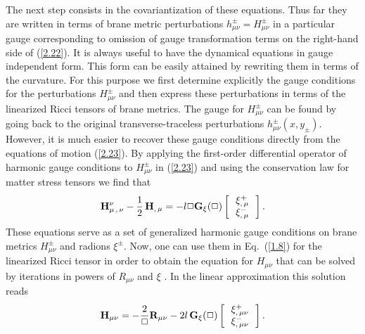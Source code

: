 \documentclass[a4paper,preprint,nofootinbib,
                 showpacs,preprintnumbers,amsmath,amssymb]{revtex4}
\begin{document}
The next step consists in the covariantization of these equations. 
Thus far they are written in terms of brane metric perturbations 
$h_{\mu\nu}^\pm=H^\pm_{\mu\nu}$ in a particular gauge 
corresponding to omission of gauge transformation terms on the 
right-hand side of (\ref{2.22}). It is always useful to have the 
dynamical equations in gauge independent form. This form can be 
easily attained by rewriting them in terms of the curvature. For 
this purpose we first determine explicitly the gauge conditions 
for the perturbations $H^\pm_{\mu\nu}$ and then express these 
perturbations in terms of the linearized Ricci tensors of brane 
metrics. The gauge for $H^\pm_{\mu\nu}$ can be found by going back 
to the original transverse-traceless perturbations 
$h_{\mu\nu}^\pm(x,y_\pm)$. However, it is much easier to recover 
these gauge conditions directly from the equations of motion 
(\ref{2.23}). By applying the first-order differential operator of 
harmonic gauge conditions to $H^\pm_{\mu\nu}$ in (\ref{2.23}) and 
using the conservation law for matter stress tensors we find that 
    \begin{equation} 
    {\bf H}^{\nu}_{\mu\,,\,\nu}- 
      \frac12\,{\bf H}_{,\,\mu} 
      =-l\Box{\bf G_\xi}(\Box) 
    \left[\begin{array}{c} 
      \,\xi^+_{,\,\mu}\,\\ 
      \,\xi^-_{,\,\mu}\,\end{array}\right].  \label{2.24a} 
    \end{equation} 
These equations serve as a set of generalized harmonic gauge 
conditions on brane metrics $H^\pm_{\mu\nu}$ and radions 
$\xi^\pm$. Now, one can use them in Eq.~(\ref{1.8}) for the 
linearized Ricci tensor in order to obtain the equation for 
$H_{\mu\nu}$ that can be solved by iterations in powers of 
$R_{\mu\nu}$ and $\xi$ \cite{CPT}. In the linear approximation 
this solution reads 
    \begin{equation} 
    {\bf H}_{\mu\nu}=-\frac2\Box {\bf R}_{\mu\nu} 
    -2l\,{\bf G_\xi}(\Box) 
    \left[\begin{array}{c} 
    \,\xi^+_{,\,\mu\nu}\,\\ \,\xi^-_{,\,\mu\nu}\, 
    \end{array}\right].                            \label{2.24b} 
    \end{equation} 
 
\end{document}
